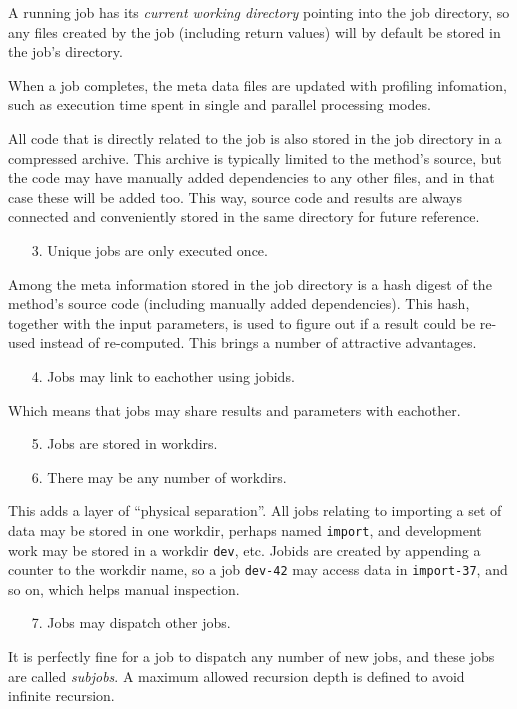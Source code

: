 A running job has its \textsl{current working directory} pointing into
the job directory, so any files created by the job (including return
values) will by default be stored in the job's directory.

When a job completes, the meta data files are updated with profiling
infomation, such as execution time spent in single and parallel
processing modes.

All code that is directly related to the job is also stored in the job
directory in a compressed archive.  This archive is typically limited
to the method's source, but the code may have manually added
dependencies to any other files, and in that case these will be added
too.  This way, source code and results are always connected and
conveniently stored in the same directory for future reference.
\begin{itemize}
\item[3.]  Unique jobs are only executed once.
\end{itemize}
Among the meta information stored in the job directory is a hash
digest of the method's source code (including manually added
dependencies).  This hash, together with the input parameters, is used
to figure out if a result could be re-used instead of re-computed.
This brings a number of attractive advantages.
\begin{itemize}
\item[4.]  Jobs may link to eachother using jobids.
\end{itemize}
Which means that jobs may share results and parameters with eachother.
\begin{itemize}
\item[5.]  Jobs are stored in workdirs.
\item[6.]  There may be any number of workdirs.
\end{itemize}
This adds a layer of ``physical separation''.  All jobs relating to
importing a set of data may be stored in one workdir, perhaps named
\texttt{import}, and development work may be stored in a workdir
\texttt{dev}, etc.  Jobids are created by appending a counter to the
workdir name, so a job \texttt{dev-42} may access data in
\texttt{import-37}, and so on, which helps manual inspection.
\begin{itemize}
\item[7.] Jobs may dispatch other jobs.
\end{itemize}
It is perfectly fine for a job to dispatch any number of new jobs, and
these jobs are called \textsl{subjobs}.  A maximum allowed recursion
depth is defined to avoid infinite recursion.


